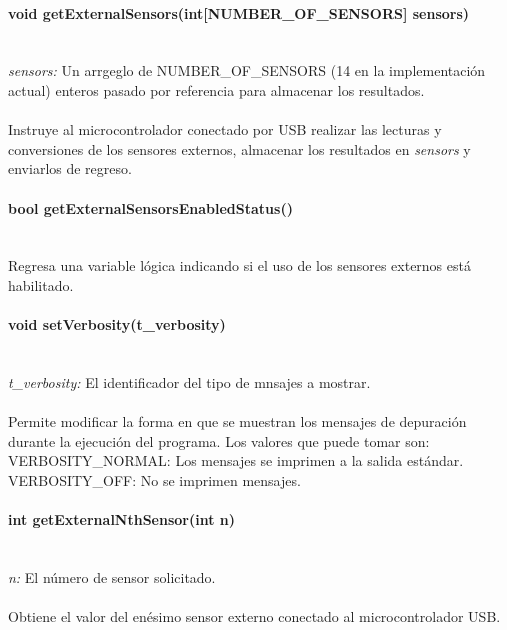 \documentclass[letterpaper,openright,12pt]{book}
\begin{document}
\paragraph{void getExternalSensors(int[NUMBER\_OF\_SENSORS] sensors)}\mbox{}\\
\emph{sensors: }Un arrgeglo de NUMBER\_OF\_SENSORS (14 en la implementación actual) enteros pasado por referencia para almacenar los resultados.\\\\
Instruye al microcontrolador conectado por USB realizar las lecturas y conversiones de los sensores externos, almacenar los resultados en \emph{sensors} y enviarlos de regreso.\\
\paragraph{bool getExternalSensorsEnabledStatus()}\mbox{}\\
Regresa una variable lógica indicando si el uso de los sensores externos está habilitado.\\
\paragraph{void setVerbosity(t\_verbosity)}\mbox{}\\
\emph{t\_verbosity: }El identificador del tipo de mnsajes a mostrar.\\\\
Permite modificar la forma en que se muestran los mensajes de depuración durante la ejecución del programa. Los valores que puede tomar son:\\
VERBOSITY\_NORMAL: Los mensajes se imprimen a la salida estándar.\\
VERBOSITY\_OFF: No se imprimen mensajes.\\

\paragraph{int getExternalNthSensor(int n)}\mbox{}\\
\emph{n: }El número de sensor solicitado.\\\\
Obtiene el valor del enésimo sensor externo conectado al microcontrolador USB.\\
\end{document}
